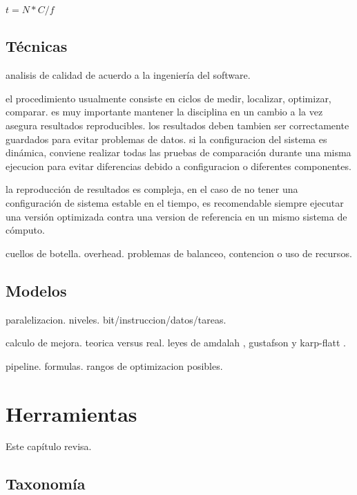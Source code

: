 \documentclass[a4paper]{report}
\begin{document}
\bigskip

$ t = N * C / f $

\section{T\'ecnicas}

analisis de calidad de acuerdo a la ingenier\'ia del software.

\bigskip

el procedimiento usualmente consiste en ciclos de medir, localizar, optimizar, comparar.
es muy importante mantener la disciplina en un cambio a la vez asegura resultados reproducibles. los resultados deben tambien ser correctamente guardados para evitar problemas de datos.
si la configuracion del sistema es din\'amica, conviene realizar todas las pruebas de comparaci\'on durante una misma ejecucion para evitar diferencias debido a configuracion o diferentes
componentes.

\bigskip

la reproducci\'on de resultados es compleja, en el caso de no tener una configuraci\'on
de sistema estable en el tiempo, es recomendable siempre ejecutar una versi\'on
optimizada contra una version de referencia en un mismo sistema de c\'omputo.

\bigskip

cuellos de botella. overhead. problemas de balanceo, contencion o uso de recursos.

\section{Modelos}

paralelizacion. niveles. bit/instruccion/datos/tareas.

calculo de mejora. teorica versus real. leyes de amdalah \cite{amdahl}, gustafson
\cite{gustafson} y karp-flatt \cite{karp-flatt}.

pipeline. formulas. rangos de optimizacion posibles.

\chapter{Herramientas}

Este cap\'itulo revisa.

\section{Taxonom\'ia}
\end{document}
